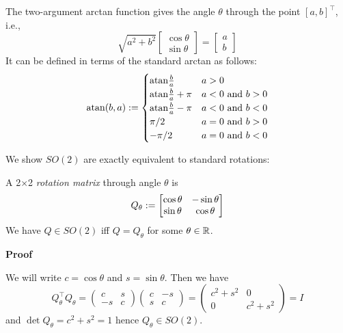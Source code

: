 \begin{definition} The two-argument arctan function gives the angle \texttt{\ensuremath{\theta}} through the point $[a,b]^\ensuremath{\top}$, i.e., 
\[
\sqrt{a^2 + b^2} \begin{bmatrix} \cos \ensuremath{\theta} \\ \sin \ensuremath{\theta} \end{bmatrix} =  \begin{bmatrix} a \\ b \end{bmatrix}
\]
It can be defined in terms of the standard arctan as follows:
\[
{\rm atan}(b,a) := \begin{cases} {\rm atan}{b \over a} & a > 0 \\
                            {\rm atan}{b \over a} + \ensuremath{\pi} & a < 0\hbox{ and }b >0 \\
                            {\rm atan}{b \over a} - \ensuremath{\pi} & a < 0\hbox{ and }b < 0 \\
                            \ensuremath{\pi}/2 & a = 0\hbox{ and }b >0 \\
                            -\ensuremath{\pi}/2 & a = 0\hbox{ and }b < 0 
                            \end{cases}
\]
\end{definition}

We show $SO(2)$ are exactly equivalent to standard rotations:

\begin{proposition} A 2\ensuremath{\times}2 \emph{rotation matrix} through angle $\ensuremath{\theta}$ is
\[
Q_\ensuremath{\theta} := \begin{bmatrix} \cos \ensuremath{\theta} & -\sin \ensuremath{\theta} \cr \sin \ensuremath{\theta} & \cos \ensuremath{\theta} \end{bmatrix}
\]
We have $Q \ensuremath{\in} SO(2)$ iff $Q = Q_\ensuremath{\theta}$ for some $\theta \in {\mathbb R}$.

\end{proposition}
\textbf{Proof}

We will write $c = \cos \ensuremath{\theta}$ and $s = \sin \ensuremath{\theta}$. Then we have
\[
Q_\ensuremath{\theta}^\ensuremath{\top}Q_\ensuremath{\theta} = \begin{pmatrix} c & s \\ -s & c \end{pmatrix} \begin{pmatrix} c & -s \\ s & c \end{pmatrix} = 
\begin{pmatrix} c^2 + s^2 & 0 \\ 0 & c^2 + s^2 \end{pmatrix} = I
\]
and $\det Q_\ensuremath{\theta} = c^2 + s^2 = 1$ hence $Q_\ensuremath{\theta} \ensuremath{\in} SO(2)$. 

